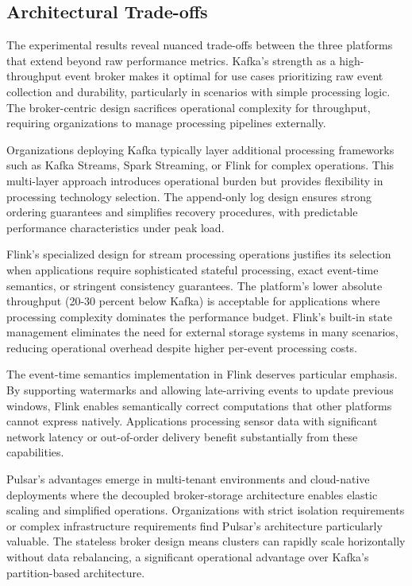 \documentclass[10pt,twocolumn]{article}
\begin{document}
\subsection{Architectural Trade-offs}

The experimental results reveal nuanced trade-offs between the three platforms that extend beyond raw performance metrics. Kafka's strength as a high-throughput event broker makes it optimal for use cases prioritizing raw event collection and durability, particularly in scenarios with simple processing logic. The broker-centric design sacrifices operational complexity for throughput, requiring organizations to manage processing pipelines externally.

Organizations deploying Kafka typically layer additional processing frameworks such as Kafka Streams, Spark Streaming, or Flink for complex operations. This multi-layer approach introduces operational burden but provides flexibility in processing technology selection. The append-only log design ensures strong ordering guarantees and simplifies recovery procedures, with predictable performance characteristics under peak load.

Flink's specialized design for stream processing operations justifies its selection when applications require sophisticated stateful processing, exact event-time semantics, or stringent consistency guarantees. The platform's lower absolute throughput (20-30 percent below Kafka) is acceptable for applications where processing complexity dominates the performance budget. Flink's built-in state management eliminates the need for external storage systems in many scenarios, reducing operational overhead despite higher per-event processing costs.

The event-time semantics implementation in Flink deserves particular emphasis. By supporting watermarks and allowing late-arriving events to update previous windows, Flink enables semantically correct computations that other platforms cannot express natively. Applications processing sensor data with significant network latency or out-of-order delivery benefit substantially from these capabilities.

Pulsar's advantages emerge in multi-tenant environments and cloud-native deployments where the decoupled broker-storage architecture enables elastic scaling and simplified operations. Organizations with strict isolation requirements or complex infrastructure requirements find Pulsar's architecture particularly valuable. The stateless broker design means clusters can rapidly scale horizontally without data rebalancing, a significant operational advantage over Kafka's partition-based architecture.
\end{document}
